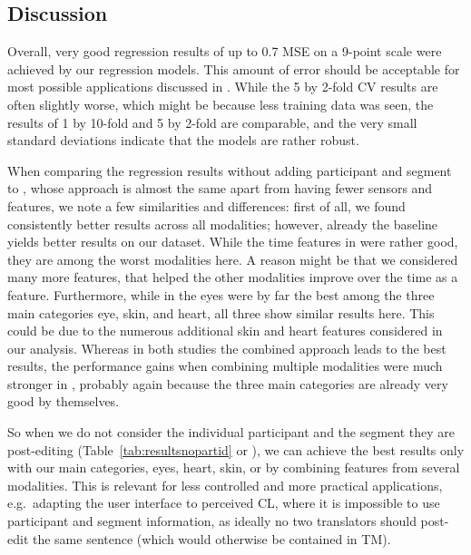 \documentclass[output=paper]{langsci/langscibook}
\begin{document}


\subsection{Discussion}
Overall, very good regression results of up to 0.7 MSE on a 9-point scale were achieved by our regression models. This amount of error should be acceptable for most possible applications discussed in \cite{herbig2019chi}. %
While the 5 by 2-fold CV results are often slightly worse, which might be because less training data was seen, the results of 1 by 10-fold and 5 by 2-fold are comparable, and the very small standard deviations indicate that the models are rather robust.

When comparing the regression results without adding participant and segment to \citet{herbig2019mt}, whose approach is almost the same apart from having fewer sensors and features, we note a few similarities and differences: first of all, we found consistently better results across all modalities; however, already the baseline yields better results on our dataset. %
While the time features in \citet{herbig2019mt} were rather good, they are among the worst modalities here. A reason might be that we considered many more features, that helped the other modalities improve over the time as a feature.
Furthermore, while in \citet{herbig2019mt} the eyes were by far the best among the three main categories eye, skin, and heart, all three show similar results here. This could be due to the numerous additional skin and heart features considered in our analysis. Whereas in both studies the combined approach leads to the best results, the performance gains when combining multiple modalities were much stronger in \citet{herbig2019mt}, %
probably again because the three main categories are already very good by themselves. %

So when we do not consider the individual participant and the segment they are post-editing (Table~\ref{tab:resultsnopartid} or \citealp{herbig2019mt}), we can achieve the best results only with our main categories, eyes, heart, skin, or by combining features from several modalities.
This is relevant for less controlled and more practical applications, e.g.\ adapting the user interface to perceived CL, where it is impossible to use participant and segment information, as ideally no two translators should post-edit the same sentence (which would otherwise be contained in TM).
\end{document}
